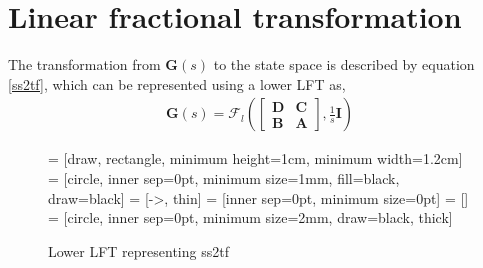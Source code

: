 \section{Linear fractional transformation}
The transformation from $\mathbf{G}(s)$ to the state space is described by equation \eqref{ss2tf}, which can be represented using a lower LFT \cite{Fran01} as,
\begin{align*}
    \bm{G}(s) = \mathcal{F}_l\left(\begin{bmatrix}
        \bm{D} & \bm{C} \\
        \bm{B} & \bm{A}
    \end{bmatrix},\frac{1}{s}\bm{I}\right)
\end{align*}
\begin{figure}[htb]
  \centering
       = [draw, rectangle, minimum height=1cm, minimum width=1.2cm]
        = [circle, inner sep=0pt, minimum size=1mm, fill=black, draw=black]
     = [->, thin]
         = [inner sep=0pt, minimum size=0pt]
         = []
           = [circle, inner sep=0pt, minimum size=2mm, draw=black, thick]
	  \caption{Lower LFT representing ss2tf}
    \label{fig:LFT1}
\end{figure} 

